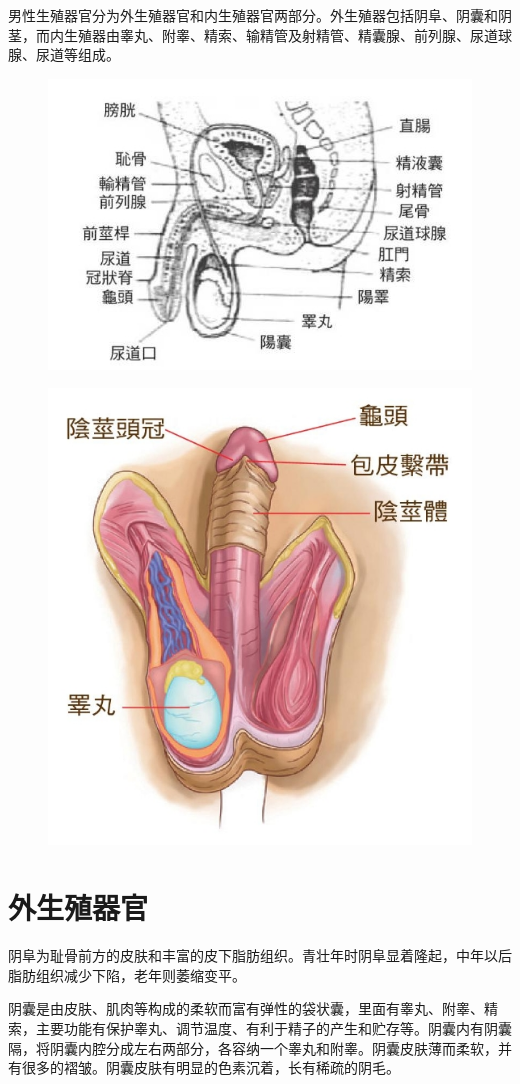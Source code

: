 \documentclass[12pt,UTF8]{ctexbook}
\begin{document}
男性生殖器官分为外生殖器官和内生殖器官两部分。外生殖器包括阴阜、阴囊和阴茎，而内生殖器由睾丸、附睾、精索、输精管及射精管、精囊腺、前列腺、尿道球腺、尿道等组成。

\begin{figure}[H]
	\centering
	\includegraphics[width=0.7\linewidth]{4}
	\caption{}
\end{figure}

\begin{figure}[H]
	\centering
	\includegraphics[width=0.7\linewidth]{13}
	\caption{}
\end{figure}

\section{外生殖器官}

阴阜为耻骨前方的皮肤和丰富的皮下脂肪组织。青壮年时阴阜显着隆起，中年以后脂肪组织减少下陷，老年则萎缩变平。

阴囊是由皮肤、肌肉等构成的柔软而富有弹性的袋状囊，里面有睾丸、附睾、精索，主要功能有保护睾丸、调节温度、有利于精子的产生和贮存等。阴囊内有阴囊隔，将阴囊内腔分成左右两部分，各容纳一个睾丸和附睾。阴囊皮肤薄而柔软，并有很多的褶皱。阴囊皮肤有明显的色素沉着，长有稀疏的阴毛。
\end{document}
